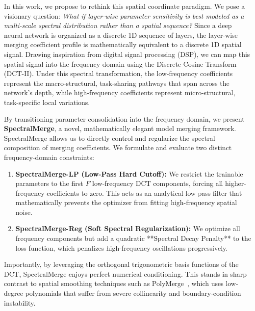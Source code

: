 In this work, we propose to rethink this spatial coordinate paradigm. We pose a visionary question: \emph{What if layer-wise parameter sensitivity is best modeled as a multi-scale spectral distribution rather than a spatial sequence?} Since a deep neural network is organized as a discrete 1D sequence of layers, the layer-wise merging coefficient profile is mathematically equivalent to a discrete 1D spatial signal. Drawing inspiration from digital signal processing (DSP), we can map this spatial signal into the frequency domain using the Discrete Cosine Transform (DCT-II). Under this spectral transformation, the low-frequency coefficients represent the macro-structural, task-sharing pathways that span across the network's depth, while high-frequency coefficients represent micro-structural, task-specific local variations.

By transitioning parameter consolidation into the frequency domain, we present \textbf{SpectralMerge}, a novel, mathematically elegant model merging framework. SpectralMerge allows us to directly control and regularize the spectral composition of merging coefficients. We formulate and evaluate two distinct frequency-domain constraints:
\begin{enumerate}
    \item \textbf{SpectralMerge-LP (Low-Pass Hard Cutoff):} We restrict the trainable parameters to the first $F$ low-frequency DCT components, forcing all higher-frequency coefficients to zero. This acts as an analytical low-pass filter that mathematically prevents the optimizer from fitting high-frequency spatial noise.
    \item \textbf{SpectralMerge-Reg (Soft Spectral Regularization):} We optimize all frequency components but add a quadratic **Spectral Decay Penalty** to the loss function, which penalizes high-frequency oscillations progressively.
\end{enumerate}
Importantly, by leveraging the orthogonal trigonometric basis functions of the DCT, SpectralMerge enjoys perfect numerical conditioning. This stands in sharp contrast to spatial smoothing techniques such as PolyMerge~\cite{polymerge}, which uses low-degree polynomials that suffer from severe collinearity and boundary-condition instability.

